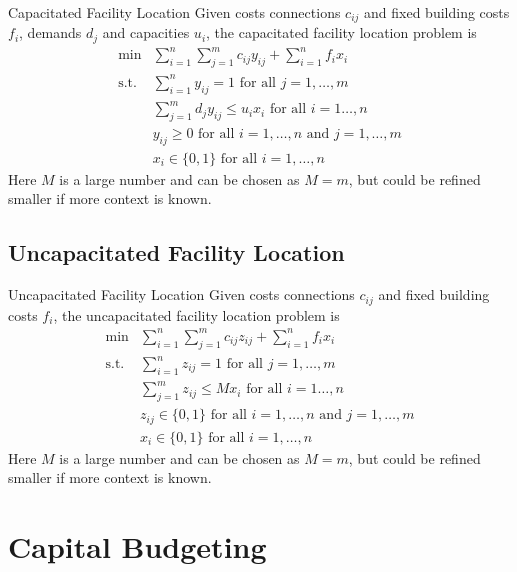 \documentclass[../open-optimization/open-optimization.tex]{subfiles}
\begin{document}
\begin{general}{Capacitated Facility Location}{\npcomplete}
Given costs connections $c_{ij}$ and fixed building costs $f_i$, demands $d_j$ and capacities $u_i$, the capacitated facility location problem is 
\begin{equation}
\begin{array}{rl}
\min & \displaystyle\sum_{i=1}^n\sum_{j=1}^mc_{ij}y_{ij}+\sum_{i=1}^nf_ix_i \\
\text{s.t.} & \displaystyle\sum_{i=1}^ny_{ij}=1 \text{ for all }j=1,\dots,m \\
& \displaystyle \sum_{j=1}^md_jy_{ij}\leqslant u_ix_i\text{ for all }i=1\dots,n \\
&y_{ij}\geqslant0\text{ for all }i=1,\dots,n \text{ and }j=1,\dots,m\\
&x_i\in\{0,1\}\text{ for all } i=1,\dots,n
\end{array}
\end{equation}
Here $M$ is a large number and can be chosen as $M = m$, but could be refined smaller if more context is known.
\end{general}

\subsection{Uncapacitated Facility Location}

\begin{general}{Uncapacitated Facility Location}{\npcomplete}
Given costs connections $c_{ij}$ and fixed building costs $f_i$, the uncapacitated facility location problem is 
\begin{equation}
\begin{array}{rl}
\min & \displaystyle\sum_{i=1}^n\sum_{j=1}^mc_{ij}z_{ij}+\sum_{i=1}^nf_ix_i \\
\text{s.t.} & \displaystyle\sum_{i=1}^nz_{ij}=1 \text{ for all }j=1,\dots,m \\
& \displaystyle \sum_{j=1}^mz_{ij}\leqslant Mx_i\text{ for all }i=1\dots,n \\
&z_{ij}\in\{0,1\}\text{ for all }i=1,\dots,n \text{ and }j=1,\dots,m\\
&x_i\in\{0,1\}\text{ for all } i=1,\dots,n
\end{array}
\end{equation}
Here $M$ is a large number and can be chosen as $M = m$, but could be refined smaller if more context is known.
\end{general}


\section{Capital Budgeting}
\end{document}
